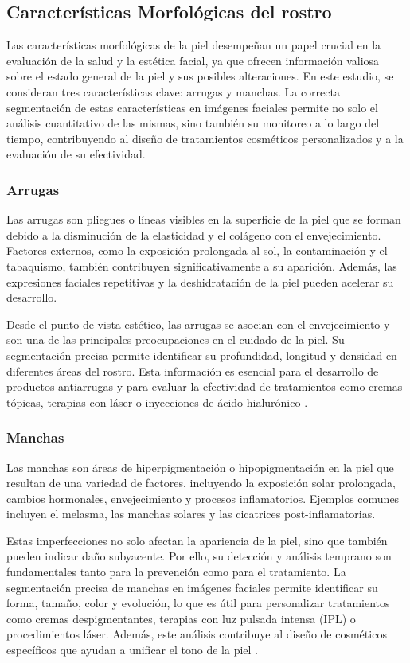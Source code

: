 \subsection{Características Morfológicas del rostro}
Las características morfológicas de la piel desempeñan un papel crucial en la evaluación de la salud y la estética facial, ya que ofrecen información valiosa sobre el estado general de la piel y sus posibles alteraciones. En este estudio, se consideran tres características clave: arrugas y manchas. La correcta segmentación de estas características en imágenes faciales permite no solo el análisis cuantitativo de las mismas, sino también su monitoreo a lo largo del tiempo, contribuyendo al diseño de tratamientos cosméticos personalizados y a la evaluación de su efectividad.

\subsubsection{Arrugas}
Las arrugas son pliegues o líneas visibles en la superficie de la piel que se forman debido a la disminución de la elasticidad y el colágeno con el envejecimiento. Factores externos, como la exposición prolongada al sol, la contaminación y el tabaquismo, también contribuyen significativamente a su aparición. Además, las expresiones faciales repetitivas y la deshidratación de la piel pueden acelerar su desarrollo.

Desde el punto de vista estético, las arrugas se asocian con el envejecimiento y son una de las principales preocupaciones en el cuidado de la piel. Su segmentación precisa permite identificar su profundidad, longitud y densidad en diferentes áreas del rostro. Esta información es esencial para el desarrollo de productos antiarrugas y para evaluar la efectividad de tratamientos como cremas tópicas, terapias con láser o inyecciones de ácido hialurónico \cite{autor2021arrugas}.

\subsubsection{Manchas}
Las manchas son áreas de hiperpigmentación o hipopigmentación en la piel que resultan de una variedad de factores, incluyendo la exposición solar prolongada, cambios hormonales, envejecimiento y procesos inflamatorios. Ejemplos comunes incluyen el melasma, las manchas solares y las cicatrices post-inflamatorias.

Estas imperfecciones no solo afectan la apariencia de la piel, sino que también pueden indicar daño subyacente. Por ello, su detección y análisis temprano son fundamentales tanto para la prevención como para el tratamiento. La segmentación precisa de manchas en imágenes faciales permite identificar su forma, tamaño, color y evolución, lo que es útil para personalizar tratamientos como cremas despigmentantes, terapias con luz pulsada intensa (IPL) o procedimientos láser. Además, este análisis contribuye al diseño de cosméticos específicos que ayudan a unificar el tono de la piel \cite{autor2019manchas}.
